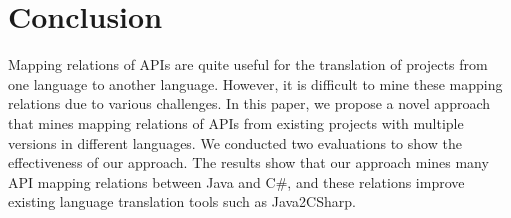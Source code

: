 \section{Conclusion}
\label{sec:conclusion} 

Mapping relations of APIs are quite useful for the translation
of projects from one language to another language. However,
it is difficult to mine these mapping relations due to various
challenges. In this paper, we propose a novel approach that mines mapping
relations of APIs from existing projects with multiple versions in
different languages. We conducted two evaluations to show the effectiveness
of our approach. The results show that our approach mines many API mapping 
relations between Java and C\#, and these relations improve existing language
translation tools such as Java2CSharp.
